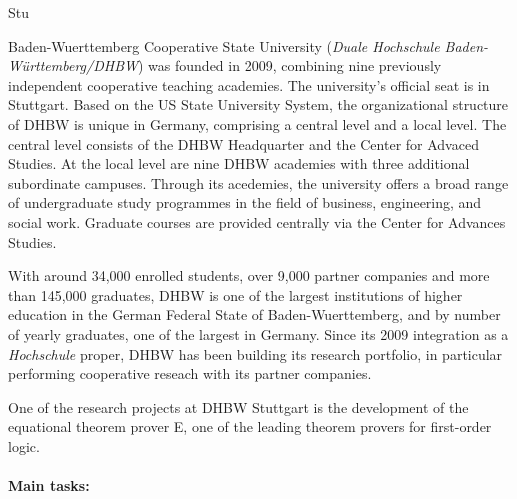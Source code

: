 \begin{sitedescription}{Stu}






Baden-Wuerttemberg Cooperative State University (\emph{Duale
  Hochschule Baden-Württemberg/DHBW}) was founded in 2009, combining
nine previously independent cooperative teaching academies. The
university's official seat is in Stuttgart. Based on the US State
University System, the organizational structure of DHBW is unique in
Germany, comprising a central level and a local level. The central
level consists of the DHBW Headquarter and the Center for Advaced
Studies. At the local level are nine DHBW academies with three
additional subordinate campuses. Through its acedemies, the university
offers a broad range of undergraduate study programmes in the field of
business, engineering, and social work. Graduate courses are provided
centrally via the Center for Advances Studies.


With around 34,000 enrolled students, over 9,000 partner companies and
more than 145,000 graduates, DHBW is one of the largest institutions
of higher education in the German Federal State of Baden-Wuerttemberg,
and by number of yearly graduates, one of the largest in Germany.
Since its 2009 integration as a \emph{Hochschule} proper, DHBW has
been building its research portfolio, in particular performing
cooperative reseach with its partner companies.

One of the research projects at DHBW Stuttgart is the development of
the equational theorem prover E, one of the leading theorem provers
for first-order logic.


\paragraph*{Main tasks:}


\end{sitedescription}
